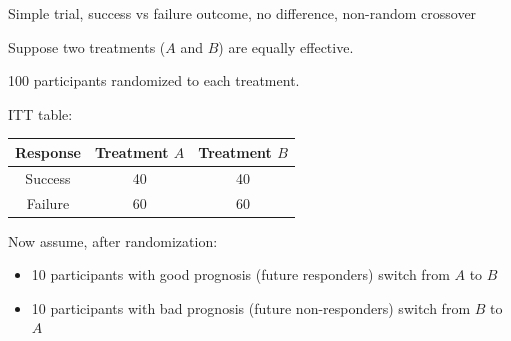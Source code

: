 \documentclass[ignorenonframetext,]{beamer}
\begin{document}
\begin{frame}{Simple trial, success vs failure outcome, no difference,
non-random crossover}

Suppose two treatments (\(A\) and \(B\)) are equally effective.

100 participants randomized to each treatment.

ITT table:

\begin{longtable}[]{@{}ccc@{}}
\toprule
\begin{minipage}[b]{0.15\columnwidth}\centering\strut
Response\strut
\end{minipage} & \begin{minipage}[b]{0.22\columnwidth}\centering\strut
Treatment \(A\)\strut
\end{minipage} & \begin{minipage}[b]{0.25\columnwidth}\centering\strut
Treatment \(B\)\strut
\end{minipage}\tabularnewline
\midrule
\endhead
\begin{minipage}[t]{0.15\columnwidth}\centering\strut
Success\strut
\end{minipage} & \begin{minipage}[t]{0.22\columnwidth}\centering\strut
40\strut
\end{minipage} & \begin{minipage}[t]{0.25\columnwidth}\centering\strut
40\strut
\end{minipage}\tabularnewline
\begin{minipage}[t]{0.15\columnwidth}\centering\strut
Failure\strut
\end{minipage} & \begin{minipage}[t]{0.22\columnwidth}\centering\strut
60\strut
\end{minipage} & \begin{minipage}[t]{0.25\columnwidth}\centering\strut
60\strut
\end{minipage}\tabularnewline
\bottomrule
\end{longtable}

Now assume, after randomization:

\begin{itemize}
\item
  10 participants with good prognosis (future responders) switch from
  \(A\) to \(B\)
\item
  10 participants with bad prognosis (future non-responders) switch from
  \(B\) to \(A\)
\end{itemize}

\end{frame}
\end{document}

